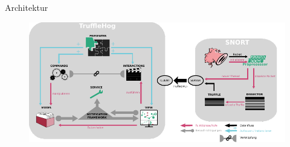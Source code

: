 \begin{frame}{Architektur}
    \begin{figure}
    	\centering
    	\includegraphics[width=\textwidth]{./images/arch/20.pdf}
    \end{figure}
\end{frame}

